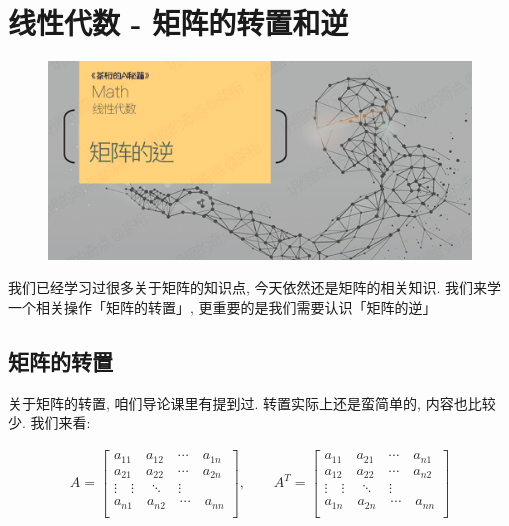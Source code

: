 \chapter{线性代数 - 矩阵的转置和逆}

\begin{figure}[ht]
  \centering
  \includegraphics[width=1\linewidth]{asset/20230911220704.png}
\end{figure}

\newpage

我们已经学习过很多关于矩阵的知识点, 今天依然还是矩阵的相关知识. 我们来学一个相关操作「矩阵的转置」, 更重要的是我们需要认识「矩阵的逆」

\section{矩阵的转置}

关于矩阵的转置, 咱们导论课里有提到过. 转置实际上还是蛮简单的, 内容也比较少. 我们来看: 

\begin{align*}
  A = \begin{bmatrix}
  a_{11} \quad a_{12} \quad \cdots \quad a_{1n} \\
  a_{21} \quad a_{22} \quad \cdots \quad a_{2n} \\
  \vdots \quad \vdots \quad \ddots \quad \vdots \\
  a_{n1} \quad a_{n2} \quad \cdots \quad a_{nn} \\
  \end{bmatrix}, \qquad 
  A^T = \begin{bmatrix}
  a_{11} \quad a_{21} \quad \cdots \quad a_{n1} \\
  a_{12} \quad a_{22} \quad \cdots \quad a_{n2} \\
  \vdots \quad \vdots \quad \ddots \quad \vdots \\
  a_{1n} \quad a_{2n} \quad \cdots \quad a_{nn} \\
  \end{bmatrix}
\end{align*}

